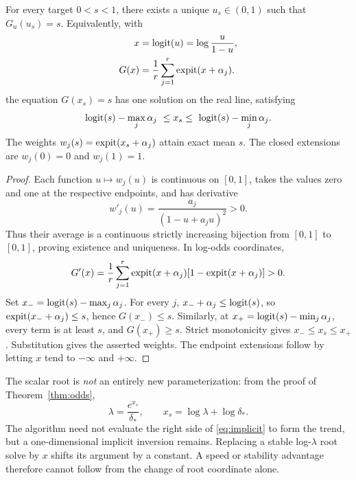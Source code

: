 \begin{theorem}\label{thm:root}
For every target $0<s<1$, there exists a unique $u_s\in(0,1)$
such that $G_u(u_s)=s$. Equivalently, with
\[
\begin{aligned}
x&=\operatorname{logit}(u)=\log\frac{u}{1-u},\\
G(x)&=\frac1r\sum_{j=1}^r\operatorname{expit}(x+\alpha_j).
\end{aligned}
\]
the equation $G(x_s)=s$ has one solution on the real line, satisfying
\begin{equation}\label{eq:bracket}
\operatorname{logit}(s)-\max_j\alpha_j
\ \le x_s\le\
\operatorname{logit}(s)-\min_j\alpha_j.
\end{equation}
The weights $w_j(s)=\operatorname{expit}(x_s+\alpha_j)$ attain exact mean $s$.
The closed extensions are $w_j(0)=0$ and $w_j(1)=1$.
\end{theorem}
\begin{proof}
Each function $u\mapsto w_j(u)$ is continuous on $[0,1]$,
takes the values zero and one at the respective endpoints, and
has derivative
\[
w'_j(u)=\frac{a_j}{(1-u+a_ju)^2}>0.
\]
Thus their average is a continuous strictly increasing bijection
from $[0,1]$ to $[0,1]$, proving existence and uniqueness.
In log-odds coordinates,
\[
G'(x)=\frac1r\sum_{j=1}^r
\operatorname{expit}(x+\alpha_j)[1-\operatorname{expit}(x+\alpha_j)]>0.
\]
Set $x_-=\operatorname{logit}(s)-\max_j\alpha_j$.
For every $j$,
$x_-+\alpha_j\le\operatorname{logit}(s)$, so
$\operatorname{expit}(x_-+\alpha_j)\le s$, hence $G(x_-)\le s$.
Similarly, at
$x_+=\operatorname{logit}(s)-\min_j\alpha_j$, every term is at least $s$,
and $G(x_+)\ge s$. Strict monotonicity gives
$x_-\le x_s\le x_+$. Substitution gives the asserted weights.
The endpoint extensions follow by letting $x$ tend to
$-\infty$ and $+\infty$.
\end{proof}

\begin{remark}\label{rem:implicit}
The scalar root is \emph{not} an entirely new parameterization:
from the proof of Theorem~\ref{thm:odds},
\begin{equation}\label{eq:implicit}
\lambda=\frac{e^{x_s}}{\delta_*},\qquad
x_s=\log\lambda+\log\delta_*.
\end{equation}
The algorithm need not evaluate the right side of \eqref{eq:implicit}
to form the trend, but a one-dimensional implicit inversion remains.
Replacing a stable log-$\lambda$ root solve by $x$ shifts its argument
by a constant. A speed or stability advantage therefore cannot follow
from the change of root coordinate alone.
\end{remark}

